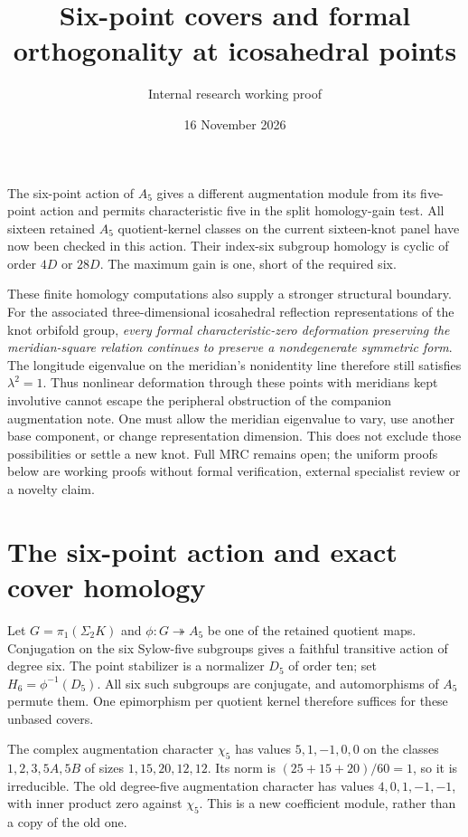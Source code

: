 \documentclass[11pt]{article}
\title{Six-point covers and formal orthogonality at icosahedral points}
\author{Internal research working proof}
\date{16 November 2026}
\begin{document}
\maketitle

The six-point action of $A_5$ gives a different augmentation module
from its five-point action and permits characteristic five in the
split homology-gain test. All sixteen retained $A_5$ quotient-kernel
classes on the current sixteen-knot panel have now been checked in
this action. Their index-six subgroup homology is cyclic of order
$4D$ or $28D$. The maximum gain is one, short of the required six.

These finite homology computations also supply a stronger structural
boundary. For the associated three-dimensional icosahedral reflection
representations of the knot orbifold group, \emph{every formal
characteristic-zero deformation preserving the meridian-square
relation continues to preserve a nondegenerate symmetric form}.
The longitude eigenvalue on the meridian's nonidentity line therefore
still satisfies $\lambda^2=1$. Thus nonlinear deformation through
these points with meridians kept involutive cannot escape the
peripheral obstruction of the companion augmentation note. One must
allow the meridian eigenvalue to vary, use another base component,
or change representation dimension. This does not exclude those
possibilities or settle a new knot. Full MRC remains open; the
uniform proofs below are working proofs without formal verification,
external specialist review or a novelty claim.

\section{The six-point action and exact cover homology}

Let $G=\pi_1(\Sigma_2K)$ and $\phi:G\twoheadrightarrow A_5$ be one
of the retained quotient maps. Conjugation on the six Sylow-five
subgroups gives a faithful transitive action of degree six. The
point stabilizer is a normalizer $D_5$ of order ten; set
$H_6=\phi^{-1}(D_5)$. All six such subgroups are conjugate, and
automorphisms of $A_5$ permute them. One epimorphism per quotient
kernel therefore suffices for these unbased covers.

The complex augmentation character $\chi_5$ has values
$5,1,-1,0,0$ on the classes $1,2,3,5A,5B$ of sizes
$1,15,20,12,12$. Its norm is $(25+15+20)/60=1$, so it is
irreducible. The old degree-five augmentation character has values
$4,0,1,-1,-1$, with inner product zero against $\chi_5$.
This is a new coefficient module, rather than a copy of the old one.
\end{document}
